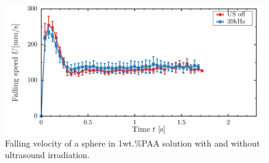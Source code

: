 \begin{figure}[ht]
    \centering
    \includegraphics[width=12cm,clip]{./X-Appendix/s1-iwamuro.png}
    \caption{Falling velocity of a sphere in 1wt.\%PAA solution with and without ultrasound irradiation.}
    \label{fig:1-2PAA-falling}
\end{figure}
